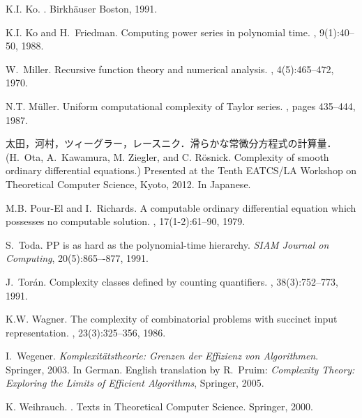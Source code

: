 \documentclass[12pt,a4paper]{article}
\theoremstyle{definition}
\theoremstyle{remark}
\begin{document}
\begin{thebibliography}{10}
K.I. Ko.
.
\newblock Birkh{\"a}user Boston, 1991.

K.I. Ko and H.~Friedman.
\newblock Computing power series in polynomial time.
, 9(1):40--50, 1988.

W.~Miller.
\newblock Recursive function theory and numerical analysis.
, 4(5):465--472, 1970.

N.T. M{\"u}ller.
\newblock Uniform computational complexity of {T}aylor series.
, pages 435--444, 1987.

太田，河村，ツィーグラー，レースニク．滑らかな常微分方程式の計算量．
(H.~Ota, A.~Kawamura, M. Ziegler, and C. R{\"o}snick. 
\newblock Complexity of smooth ordinary differential equations.) 
\newblock Presented at the 
Tenth EATCS/LA Workshop on Theoretical Computer Science, Kyoto, 2012. 
\newblock In Japanese. 

M.B. Pour-El and I.~Richards.
\newblock A computable ordinary differential equation which possesses no
  computable solution.
, 17(1-2):61--90, 1979.

S.~Toda. 
\newblock PP is as hard as the polynomial-time hierarchy. 
\newblock \emph{SIAM Journal on Computing}, 20(5):865–-877, 1991.


J.~Tor{\'a}n.
\newblock Complexity classes defined by counting quantifiers.
, 38(3):752--773, 1991.

K.W. Wagner.
\newblock The complexity of combinatorial problems with succinct input
  representation.
, 23(3):325--356, 1986.

I.~Wegener. 
\newblock \emph{Komplexit\"atstheorie: Grenzen der Effizienz von Algorithmen}. 
\newblock Springer, 2003. 
\newblock In German.
\newblock English translation by R.~Pruim: 
\emph{Complexity Theory: Exploring the Limits of Efficient Algorithms}, Springer, 2005. 

K. Weihrauch.
.
\newblock Texts in Theoretical Computer Science. Springer, 2000.
\end{thebibliography}
\end{document}
